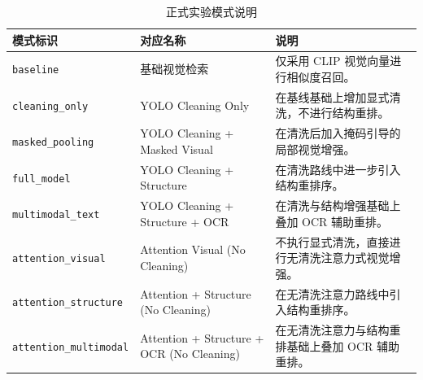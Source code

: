 \begin{table}[H]
  \centering
  \caption{正式实验模式说明}
  \label{tab:appendix-modes}
  \small
  \setlength{\tabcolsep}{5pt}
  \begin{tabularx}{\textwidth}{llX}
    \toprule
    模式标识 & 对应名称 & 说明 \\
    \midrule
    \texttt{baseline} & 基础视觉检索 & 仅采用 CLIP 视觉向量进行相似度召回。 \\
    \texttt{cleaning\_only} & YOLO Cleaning Only & 在基线基础上增加显式清洗，不进行结构重排。 \\
    \texttt{masked\_pooling} & YOLO Cleaning + Masked Visual & 在清洗后加入掩码引导的局部视觉增强。 \\
    \texttt{full\_model} & YOLO Cleaning + Structure & 在清洗路线中进一步引入结构重排序。 \\
    \texttt{multimodal\_text} & YOLO Cleaning + Structure + OCR & 在清洗与结构增强基础上叠加 OCR 辅助重排。 \\
    \texttt{attention\_visual} & Attention Visual (No Cleaning) & 不执行显式清洗，直接进行无清洗注意力式视觉增强。 \\
    \texttt{attention\_structure} & Attention + Structure (No Cleaning) & 在无清洗注意力路线中引入结构重排序。 \\
    \texttt{attention\_multimodal} & Attention + Structure + OCR (No Cleaning) & 在无清洗注意力与结构重排基础上叠加 OCR 辅助重排。 \\
    \bottomrule
  \end{tabularx}
\end{table}

